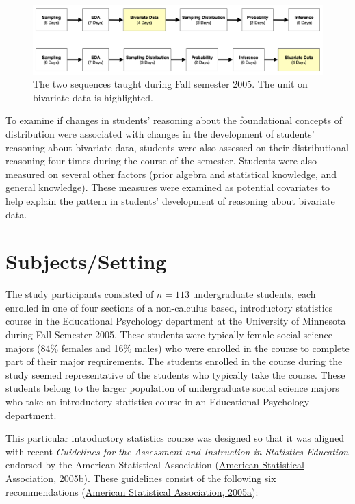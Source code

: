 \documentclass[11pt]{umnthesis}
\begin{document}
\begin{figure}[H]

{\centering \includegraphics[width=1\linewidth]{figure/fig-03-01} 

}

\caption[The two sequences taught during Fall semester 2005]{The two sequences taught during Fall semester 2005. The unit on bivariate data is highlighted.}\label{fig:fig-3-1}
\end{figure}

To examine if changes in students' reasoning about the foundational concepts of distribution were associated with changes in the development of students' reasoning about bivariate data, students were also assessed on their distributional reasoning four times during the course of the semester. Students were also measured on several other factors (prior algebra and statistical knowledge, and general knowledge). These measures were examined as potential covariates to help explain the pattern in students' development of reasoning about bivariate data.

\hypertarget{subjectssetting}{%
\section{Subjects/Setting}\label{subjectssetting}}

The study participants consisted of \(n=113\) undergraduate students, each enrolled in one of four sections of a non-calculus based, introductory statistics course in the Educational Psychology department at the University of Minnesota during Fall Semester 2005. These students were typically female social science majors (84\% females and 16\% males) who were enrolled in the course to complete part of their major requirements. The students enrolled in the course during the study seemed representative of the students who typically take the course. These students belong to the larger population of undergraduate social science majors who take an introductory statistics course in an Educational Psychology department.

This particular introductory statistics course was designed so that it was aligned with recent \emph{Guidelines for the Assessment and Instruction in Statistics Education} endorsed by the American Statistical Association (\protect\hyperlink{ref-asa:2005a}{American Statistical Association, 2005b}). These guidelines consist of the following six recommendations (\protect\hyperlink{ref-asa:2005}{American Statistical Association, 2005a}):
\end{document}
